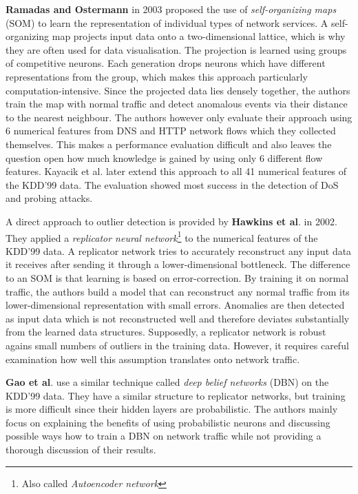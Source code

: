 \documentclass[a4paper,12pt,twoside]{report}
\begin{document}
\textbf{Ramadas and Ostermann} \cite{ramadas2003detecting} in 2003 proposed the use of \textit{self-organizing maps} (SOM) to learn the representation of individual types of network services. A self-organizing map projects input data onto a two-dimensional lattice, which is why they are often used for data visualisation. The projection is learned using groups of competitive neurons. Each generation drops neurons which have different representations from the group, which makes this approach particularly computation-intensive. Since the projected data lies densely together, the authors train the map with normal traffic and detect anomalous events via their distance to the nearest neighbour. The authors however only evaluate their approach using 6 numerical features from DNS and HTTP network flows which they collected themselves. This makes a performance evaluation difficult and also leaves the question open how much knowledge is gained by using only 6 different flow features. Kayacik et al. \cite{kayacik2007hierarchical} later extend this approach to all 41 numerical features of the KDD'99 data. The evaluation showed most success in the detection of DoS and probing attacks.


A direct approach to outlier detection is provided by \textbf{Hawkins et al}. \cite{hawkins_outlier_2002} in 2002. They applied a \textit{replicator neural network}\footnote{Also called \textit{Autoencoder network}} to the numerical features of the KDD'99 data. A replicator network tries to accurately reconstruct any input data it receives after sending it through a lower-dimensional bottleneck. The difference to an SOM is that learning is based on error-correction. By training it on normal traffic, the authors build a model that can reconstruct any normal traffic from its lower-dimensional representation with small errors. Anomalies are then detected as input data which is not reconstructed well and therefore deviates substantially from the learned data structures. Supposedly, a replicator network is robust agains small numbers of outliers in the training data. However, it requires careful examination how well this assumption translates onto network traffic. 

\textbf{Gao et al}. \cite{gao_intrusion_2014} use a similar technique called \textit{deep belief networks} (DBN) on the KDD'99 data. They have a similar structure to replicator networks, but training is more difficult since their hidden layers are probabilistic. The authors mainly focus on explaining the benefits of using probabilistic neurons and discussing possible ways how to train a DBN on network traffic while not providing a thorough discussion of their results.
\end{document}
